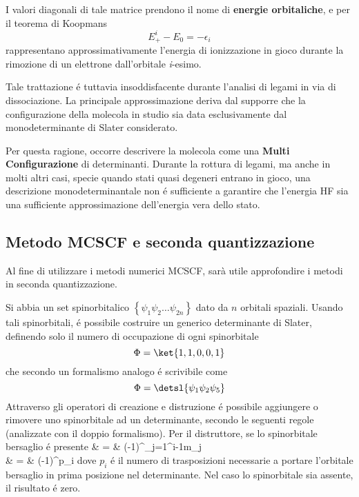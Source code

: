 I valori diagonali di tale matrice prendono il nome di \textbf{energie
orbitaliche}, e per il teorema di Koopmans
$$
E_+^i-E_0 = -\epsilon_i
$$
rappresentano approssimativamente l'energia di ionizzazione in gioco
durante la rimozione di un elettrone dall'orbitale \textit{i}-esimo.

Tale trattazione \'e tuttavia insoddisfacente durante l'analisi di
legami in via di dissociazione. La principale approssimazione deriva dal
supporre che la configurazione della molecola in studio sia data
esclusivamente dal monodeterminante di Slater considerato. 

Per questa ragione, occorre descrivere la molecola come una \textbf{Multi
Configurazione} di determinanti. Durante la rottura di legami, ma anche
in molti altri casi, specie quando stati quasi degeneri entrano in
gioco, una descrizione monodeterminantale non \'e sufficiente a garantire
che l'energia HF sia una sufficiente approssimazione dell'energia vera
dello stato.


\subsection{Metodo MCSCF e seconda quantizzazione}

Al fine di utilizzare i metodi numerici MCSCF, sar\`a utile approfondire
i metodi in seconda quantizzazione.

Si abbia un set spinorbitalico $ \left\{ \psi_1 \psi_2
\ldots \psi_{2n} \right\} $ dato da $n$ orbitali spaziali. Usando
tali spinorbitali, \'e possibile costruire un generico determinante di
Slater, definendo solo il numero di occupazione di ogni spinorbitale
$$
\Phi = \ket{1,1,0,0,1}
$$
che secondo un formalismo analogo \'e scrivibile come
$$
\Phi = \detsl{\psi_1 \psi_2 \psi_5}
$$
Attraverso gli operatori di creazione e distruzione \'e possibile
aggiungere o rimovere uno spinorbitale ad un determinante, secondo le
seguenti regole (analizzate con il doppio formalismo). Per il distruttore, 
se lo spinorbitale bersaglio \'e presente
\beqas
{}  & = &
(-1)^{\sum_{j=1}^{i-1}m_j}  \\
 & = &
(-1)^{p_i} 
\eeqas
dove $p_i$ \'e il numero di trasposizioni necessarie a portare l'orbitale
bersaglio in prima posizione nel determinante.
Nel caso lo spinorbitale sia assente, il risultato \'e zero.

